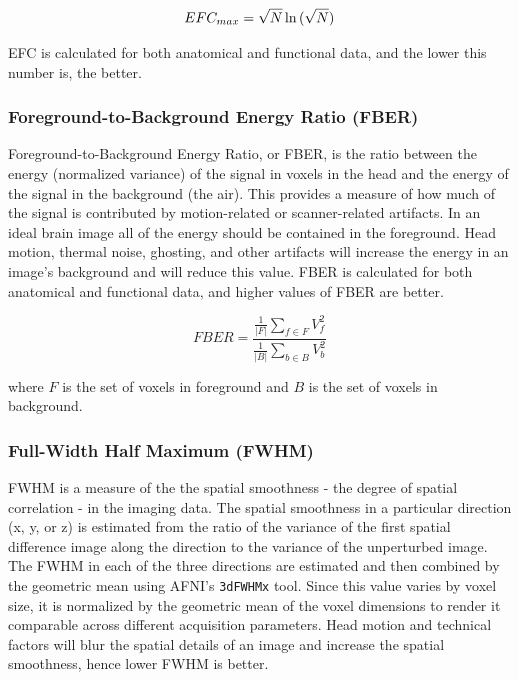 \documentclass{frontiersSCNS} %
\begin{document}
\begin{equation}
\label{eqn:EFCnorm}
EFC_{max} = \sqrt{N}\ln{(\sqrt{N})} \\
\end{equation}

EFC is calculated for both anatomical and functional data, and the lower this number is, the better.

\subsubsection*{Foreground-to-Background Energy Ratio (FBER)}
\label{sec:FBER}
Foreground-to-Background Energy Ratio, or FBER, is the ratio between the energy (normalized variance) of the signal in voxels in the head and the energy of the signal in the background (the air). This provides a measure of how much of the signal is contributed by motion-related or scanner-related artifacts. In an ideal brain image all of the energy should be contained in the foreground. Head motion, thermal noise, ghosting, and other artifacts will increase the energy in an image's background and will reduce this value. FBER is calculated for both anatomical and functional data, and higher values of FBER are better.

\begin{equation}
FBER = \frac{\displaystyle\frac{1}{|F|}\sum_{f \in F} V_f^{2}}{\displaystyle\frac{1}{|B|}\sum_{b \in B} V_b^{2}}
\end{equation}

where $F$ is the set of voxels in foreground and $B$ is the set of voxels in background.

\subsubsection*{Full-Width Half Maximum (FWHM)}
\label{sec:FWHM}

FWHM is a measure of the the spatial smoothness - the degree of spatial correlation - in the imaging data. The spatial smoothness in a particular direction (x, y, or z) is estimated from the ratio of the variance of the first spatial difference image along the direction to the variance of the unperturbed image. The FWHM in each of the three directions are estimated and then combined by the geometric mean using AFNI's \texttt{3dFWHMx} tool. Since this value varies by voxel size, it is normalized by the geometric mean of the voxel dimensions to render it comparable across different acquisition parameters. Head motion and technical factors will blur the spatial details of an image and increase the spatial smoothness, hence lower FWHM is better. 
\end{document}
